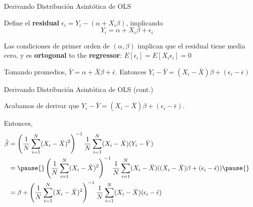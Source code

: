\documentclass[11pt,handout,aspectratio=169]{beamer}
\newenvironment{wideitemize}{\itemize\addtolength{\itemsep}{10pt}}{\enditemize}
\begin{document}
\begin{frame}{Derivando Distribución Asintótica de OLS}
\begin{wideitemize}

\item
Define el \textbf{residual} $\epsilon_i = Y_i - (\alpha+X_i \beta)$, implicando
\begin{equation*}
Y_i = \alpha + X_i \beta + \epsilon_i	
\end{equation*}

\pause
\item
Las condiciones de primer orden de $(\alpha,\beta)$ implican que el residual tiene media cero, y es \textbf{ortogonal} to the \textbf{regressor}: $E[\epsilon_i] = E[X_i \epsilon_i] =0$

\pause
\item
Tomando promedios, $\bar{Y} = \alpha + \bar{X} \beta + \bar{\epsilon}$. \pause Entonces $Y_i - \bar{Y} = (X_i - \bar{X})\beta + (\epsilon_i-\bar\epsilon)$

\end{wideitemize}

\end{frame}

\begin{frame}{Derivando Distribución Asintótica de OLS (cont.)}
	\begin{wideitemize}
		
		\item
		Acabamos de derivar que $Y_i - \bar{Y} = (X_i - \bar{X})\beta + (\epsilon_i-\bar\epsilon)$. 
		
		\item
		Entonces,
		\begin{align*}
			\hat\beta &=\left( \frac{1}{N} \sum_{i=1}^N (X_i - \bar{X})^2 \right)^{-1}   \frac{1}{N} \sum_{i=1}^{N} (X_i - \bar{X})(Y_i - \bar{Y})   \\
			&=\pause{} \left( \frac{1}{N} \sum_{i=1}^N (X_i - \bar{X})^2 \right)^{-1}   \frac{1}{N} \sum_{i=1}^{N} (X_i - \bar{X})((X_i - \bar{X})\beta + (\epsilon_i-\bar\epsilon) ) \pause{} \\
			& =\beta + \left( \frac{1}{N} \sum_{i=1}^N (X_i - \bar{X})^2 \right)^{-1}   \frac{1}{N} \sum_{i=1}^{N} (X_i - \bar{X}) (\epsilon_i - \bar\epsilon)
		\end{align*}
\end{wideitemize}	
\end{frame}
\end{document}
